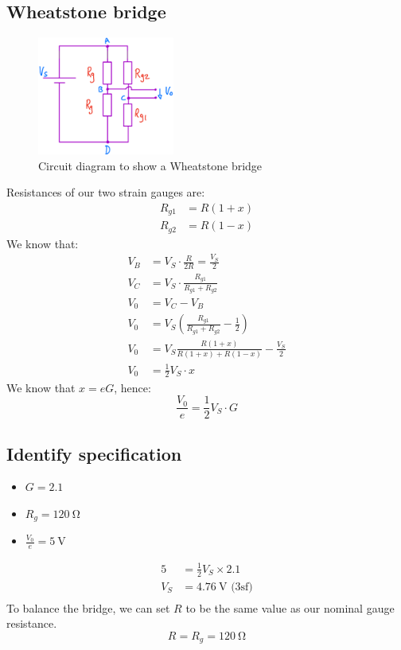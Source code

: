 \documentclass[12pt]{article}
\numberwithin{equation}{section}
\begin{document}
\subsection*{Wheatstone bridge}
\begin{figure}[H]
  \centering
  \includegraphics[width=0.4\textwidth]{./img/4-1circuit.png}
  \caption{Circuit diagram to show a Wheatstone bridge}
\end{figure}
Resistances of our two strain gauges are:
\begin{align}
  R_{g1} &= R(1+x)\\
  R_{g2} &= R(1-x)
\end{align}
We know that:
\begin{align}
  V_B &= V_S\cdot \frac{R}{2R} = \frac{V_S}{2}\\
  V_C &= V_S\cdot \frac{R_{g1}}{R_{g1} + R_{g2}}\\
  V_0 &= V_C - V_B\\ 
  V_0 &= V_S \left( \frac{R_{g1}}{R_{g1} + R_{g2}} - \frac{1}{2} \right)\\
  V_0 &= V_S \frac{R(1+x)}{R(1+x) + R(1-x)} - \frac{V_S}{2}\\
  V_0 &= \frac{1}{2} V_S \cdot x
\end{align}
We know that $x = eG$, hence:
\begin{equation}
  \frac{V_0}{e} = \frac{1}{2}V_S \cdot G
\end{equation}
\subsection*{Identify specification}
\begin{itemize}
  \item $G = 2.1$
  \item $R_g = \SI{120}{\ohm}$
  \item $\frac{V_0}{e} = \SI{5}{\volt}$
\end{itemize}
\begin{align}
  5 &= \frac{1}{2} V_S \times 2.1\\
  V_S &= \SI{4.76}{\volt} \textrm{ (3sf)}\\
\end{align}
To balance the bridge, we can set $R$ to be the same value as our nominal gauge resistance.
\begin{equation}
  R = R_g = \SI{120}{\ohm}
\end{equation}
\end{document}
